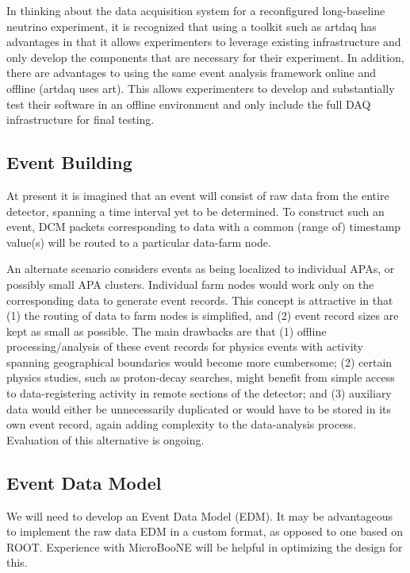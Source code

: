 In thinking about the data acquisition system for a reconfigured
long-baseline neutrino experiment, it is recognized that using a
toolkit such as artdaq has advantages in that it allows experimenters
to leverage existing infrastructure and only develop the components
that are necessary for their experiment.  In addition, there are
advantages to using the same event analysis framework online and
offline (artdaq uses art).  This allows experimenters to develop and
substantially test their software in an offline environment and only
include the full DAQ infrastructure for final testing.

\subsection{Event Building}

At present it is imagined that an event will consist of raw data from the 
entire detector, spanning a time interval yet to be determined.  To construct 
such an event, DCM packets corresponding to data with a common (range of) 
timestamp value(s) will be routed to a particular data-farm node.  

An alternate scenario considers events as being localized to individual 
APAs, or possibly small APA clusters.  Individual farm nodes would work 
only on the corresponding data to generate event records.
This concept is attractive in that (1) the routing of data to farm nodes 
is simplified, and (2) event record sizes are kept as small as possible.  
The main drawbacks are that (1) offline processing/analysis of these event 
records for physics events with activity spanning geographical 
boundaries would become more cumbersome; (2) certain physics studies, such 
as proton-decay searches, might benefit from 
simple access to data-registering activity in remote sections of the detector; and (3) auxiliary data  
would either be unnecessarily duplicated or 
would have to be stored in its own event record, again adding complexity 
to the data-analysis process.  Evaluation of this alternative is ongoing.

\subsection{Event Data Model}

We will need to develop an Event Data Model (EDM).  It may be advantageous 
to implement the raw data EDM in a custom format, as opposed to one based on 
ROOT.  Experience with MicroBooNE will be helpful in optimizing the design 
for this.

